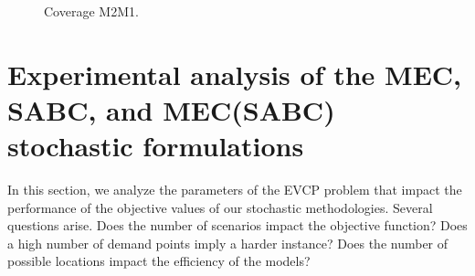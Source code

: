 \begin{figure}[H]
\hspace{0.4cm}%
\vspace{0.4cm}
\caption{Coverage M2M1.}
\label{Cov_M2M1}
\end{figure}

\section{Experimental analysis of the MEC, SABC, and MEC(SABC) stochastic formulations} \label{obj val}


In this section, we analyze the parameters of the EVCP problem that impact the performance of the objective values of our stochastic methodologies. Several questions arise. Does the number of scenarios impact the objective function? Does a high number of demand points imply a harder instance? Does the number of possible locations impact the efficiency of the models? 

